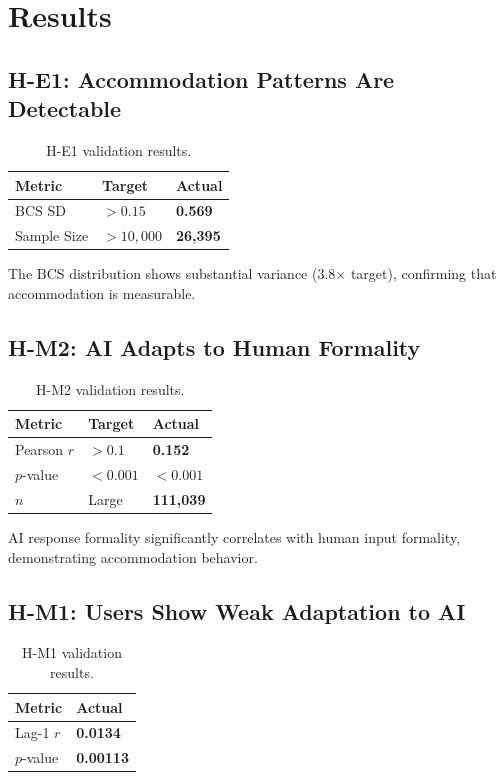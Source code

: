 \section{Results}

\subsection{H-E1: Accommodation Patterns Are Detectable}

\begin{table}[h]
\centering
\begin{tabular}{@{}lll@{}}
\toprule
Metric & Target & Actual \\
\midrule
BCS SD & $> 0.15$ & \textbf{0.569} \\
Sample Size & $> 10,000$ & \textbf{26,395} \\
\bottomrule
\end{tabular}
\caption{H-E1 validation results.}
\label{tab:he1}
\end{table}

The BCS distribution shows substantial variance (3.8$\times$ target), confirming that accommodation is measurable.

\subsection{H-M2: AI Adapts to Human Formality}

\begin{table}[h]
\centering
\begin{tabular}{@{}lll@{}}
\toprule
Metric & Target & Actual \\
\midrule
Pearson $r$ & $> 0.1$ & \textbf{0.152} \\
$p$-value & $< 0.001$ & \textbf{$< 0.001$} \\
$n$ & Large & \textbf{111,039} \\
\bottomrule
\end{tabular}
\caption{H-M2 validation results.}
\label{tab:hm2}
\end{table}

AI response formality significantly correlates with human input formality, demonstrating accommodation behavior.

\subsection{H-M1: Users Show Weak Adaptation to AI}

\begin{table}[h]
\centering
\begin{tabular}{@{}ll@{}}
\toprule
Metric & Actual \\
\midrule
Lag-1 $r$ & \textbf{0.0134} \\
$p$-value & \textbf{0.00113} \\
\bottomrule
\end{tabular}
\caption{H-M1 validation results.}
\label{tab:hm1}
\end{table}

